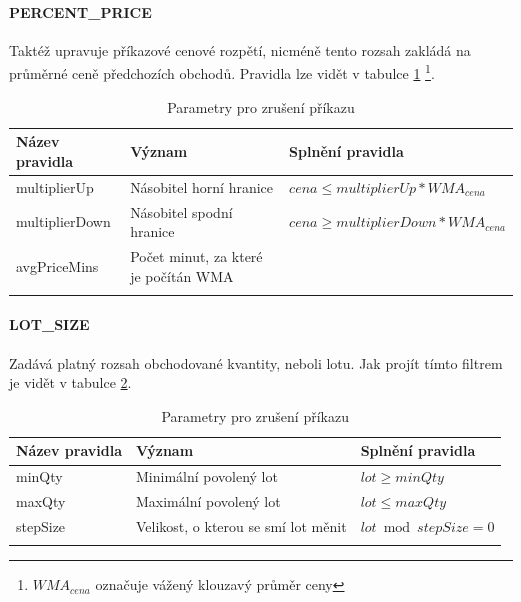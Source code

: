 \paragraph*{PERCENT\_PRICE}
Taktéž upravuje příkazové cenové rozpětí, nicméně tento rozsah zakládá na průměrné ceně předchozích obchodů. Pravidla lze vidět v tabulce \ref{tab:binance:percent_price}
\footnote{$WMA_{cena}$ označuje vážený klouzavý průměr ceny}.
\begin{center}
    \begin{longtable}[h]{|l|l|l|}
        \hline
        Název pravidla & Význam                               & Splnění pravidla                           \\
        \hline
        multiplierUp   & Násobitel horní hranice              & $ cena \leq multiplierUp * WMA_{cena} $    \\ 
        \hline
        multiplierDown & Násobitel spodní hranice             & $ cena \geq  multiplierDown * WMA_{cena} $ \\ 
        \hline
        avgPriceMins   & Počet minut, za které je počítán WMA &                                            \\ 
        \hline
        \caption{Parametry pro zrušení příkazu}
        \label{tab:binance:percent_price}
    \end{longtable}
\end{center}

\paragraph*{LOT\_SIZE}
Zadává platný rozsah obchodované kvantity, neboli lotu. Jak projít tímto filtrem je vidět v tabulce \ref{tab:binance:lot_filter}.
\begin{center}
    \begin{longtable}[h]{|l|l|l|}
        \hline
        Název pravidla & Význam                              & Splnění pravidla         \\
        \hline
        minQty         & Minimální povolený lot              & $ lot \geq minQty $      \\ 
        \hline
        maxQty         & Maximální povolený lot              & $ lot \leq  maxQty $     \\ 
        \hline
        stepSize       & Velikost, o kterou se smí lot měnit & $lot \bmod stepSize = 0$ \\ 
        \hline
        \caption{Parametry pro zrušení příkazu}
        \label{tab:binance:lot_filter}
    \end{longtable}
\end{center}

